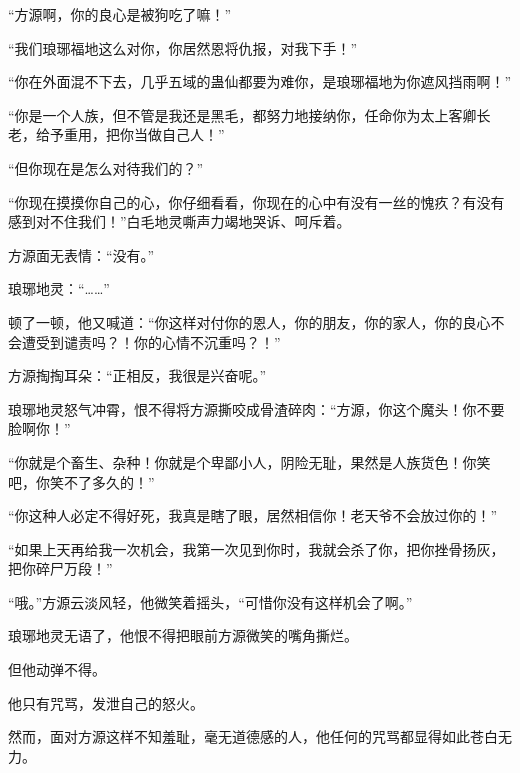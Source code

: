 \begin{this_body}
“方源啊，你的良心是被狗吃了嘛！”

“我们琅琊福地这么对你，你居然恩将仇报，对我下手！”

“你在外面混不下去，几乎五域的蛊仙都要为难你，是琅琊福地为你遮风挡雨啊！”

“你是一个人族，但不管是我还是黑毛，都努力地接纳你，任命你为太上客卿长老，给予重用，把你当做自己人！”

“但你现在是怎么对待我们的？”

“你现在摸摸你自己的心，你仔细看看，你现在的心中有没有一丝的愧疚？有没有感到对不住我们！”白毛地灵嘶声力竭地哭诉、呵斥着。

方源面无表情：“没有。”

琅琊地灵：“……”

顿了一顿，他又喊道：“你这样对付你的恩人，你的朋友，你的家人，你的良心不会遭受到谴责吗？！你的心情不沉重吗？！”

方源掏掏耳朵：“正相反，我很是兴奋呢。”

琅琊地灵怒气冲霄，恨不得将方源撕咬成骨渣碎肉：“方源，你这个魔头！你不要脸啊你！”

“你就是个畜生、杂种！你就是个卑鄙小人，阴险无耻，果然是人族货色！你笑吧，你笑不了多久的！”

“你这种人必定不得好死，我真是瞎了眼，居然相信你！老天爷不会放过你的！”

“如果上天再给我一次机会，我第一次见到你时，我就会杀了你，把你挫骨扬灰，把你碎尸万段！”

“哦。”方源云淡风轻，他微笑着摇头，“可惜你没有这样机会了啊。”

琅琊地灵无语了，他恨不得把眼前方源微笑的嘴角撕烂。

但他动弹不得。

他只有咒骂，发泄自己的怒火。

然而，面对方源这样不知羞耻，毫无道德感的人，他任何的咒骂都显得如此苍白无力。

\end{this_body}

